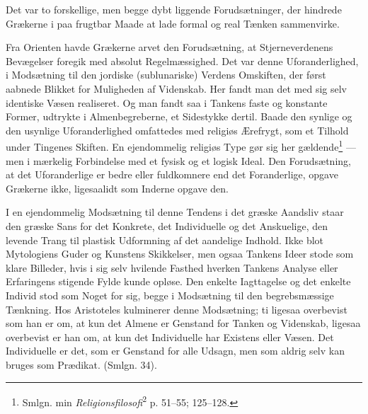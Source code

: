 \documentclass[12pt,a4paper]{book}
\newcommand{\apage}[1]{\marginnote{\footnotesize\textit{[#1]}}}
\begin{document}
Det var to forskellige, men begge dybt liggende Forudsætninger, der
hindrede Grækerne i paa frugtbar Maade at lade formal og real Tænken
sammenvirke.

Fra Orienten havde Grækerne arvet den Forudsætning, at Stjerneverdenens
Bevægelser foregik med absolut Regelmæssighed. Det var denne
Uforanderlighed, i Modsætning til den jordiske (sublunariske) Verdens
Omskiften, der først aabnede Blikket for Muligheden af Videnskab. Her
fandt man det med sig selv identiske Væsen realiseret. Og man fandt saa
i Tankens faste og konstante Former, udtrykte i Almenbegreberne, et
Sidestykke dertil. Baade den synlige og \apage{127} den usynlige Uforanderlighed
omfattedes med religiøs Ærefrygt, som et Tilhold under Tingenes Skiften.
En ejendommelig religiøs Type gør sig her gældende\footnote{Smlgn. min
\emph{Religionsfilosofi}\textsuperscript{2} p. 51--55; 125--128.} --- men
i mærkelig Forbindelse med et fysisk og et logisk Ideal. Den
Forudsætning, at det Uforanderlige er bedre eller fuldkomnere end det
Foranderlige, opgave Grækerne ikke, ligesaalidt som Inderne opgave den.

I en ejendommelig Modsætning til denne Tendens i det græske Aandsliv
staar den græske Sans for det Konkrete, det Individuelle og det
Anskuelige, den levende Trang til plastisk Udformning af det aandelige
Indhold. Ikke blot Mytologiens Guder og Kunstens Skikkelser, men ogsaa
Tankens Ideer stode som klare Billeder, hvis i sig selv hvilende Fasthed
hverken Tankens Analyse eller Erfaringens stigende Fylde kunde opløse.
Den enkelte Iagttagelse og det enkelte Individ stod som Noget for sig,
begge i Modsætning til den begrebsmæssige Tænkning. Hos Aristoteles
kulminerer denne Modsætning; ti ligesaa overbevist som han er om, at kun
det Almene er Genstand for Tanken og Videnskab, ligesaa overbevist er han
om, at kun det Individuelle har Existens eller Væsen. Det Individuelle er
det, som er Genstand for alle Udsagn, men som aldrig selv kan bruges som
Prædikat. (Smlgn. 34).
\end{document}
